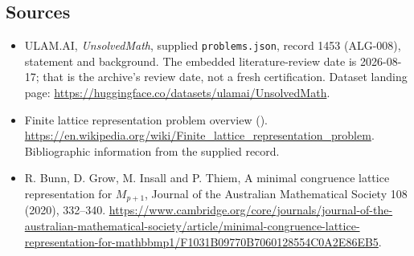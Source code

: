 \documentclass[11pt,a4paper]{article}
\begin{document}
\subsection{Sources}

{\small

\begin{itemize}

\item[\hypertarget{source:1453:1}{S1}] ULAM.AI, \emph{UnsolvedMath}, supplied \texttt{problems.json}, record 1453 (ALG-008), statement and background. The embedded literature-review date is 2026-08-17; that is the archive’s review date, not a fresh certification. Dataset landing page: \url{https://huggingface.co/datasets/ulamai/UnsolvedMath}.

\item[\hypertarget{source:1453:2}{S2}] Finite lattice representation problem overview (). \url{https://en.wikipedia.org/wiki/Finite_lattice_representation_problem}. Bibliographic information from the supplied record.

\item[R1] R. Bunn, D. Grow, M. Insall and P. Thiem, A minimal congruence lattice representation for $M_{p+1}$, Journal of the Australian Mathematical Society 108 (2020), 332--340.
\url{https://www.cambridge.org/core/journals/journal-of-the-australian-mathematical-society/article/minimal-congruence-lattice-representation-for-mathbbmp1/F1031B09770B7060128554C0A2E86EB5}.
\end{itemize}

}

\label{end:1453}
\end{document}
